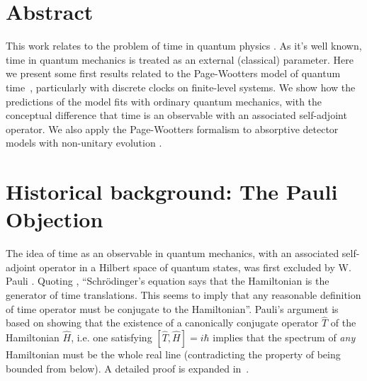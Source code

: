 \documentclass[a0,portrait]{a0poster}
\begin{document}
\begin{multicols}{2} %


\color{Navy} %

\section*{\large Abstract}
This work relates to the problem of time in quantum physics \cite{TQM1, TQM2}.
As it's well known, time in quantum mechanics is treated as an external (classical) parameter.
%
Here we present some first results related to
the Page-Wootters model of quantum time~\cite{Lloyd:Time, Maccone:Pauli},
particularly with discrete clocks on finite-level systems.
We show how the predictions of the model fits with
ordinary quantum mechanics, with the conceptual difference that
time is an observable with an associated self-adjoint operator.
We also apply the Page-Wootters formalism
to absorptive detector models with
non-unitary evolution \cite{RuschhauptAbsorption}.


\setlength{\parindent}{2em} %


\color{SaddleBrown} %


\section*{Historical background: The Pauli Objection}
The idea of time as an observable in quantum mechanics,
with an associated self-adjoint operator in a Hilbert space of quantum states,
was first excluded by W. Pauli \cite{PauliFootnote}.
%
Quoting \cite{Maccone:Pauli},
``Schr\"odinger's equation says that the Hamiltonian is the generator of time translations. This seems
to imply that any reasonable definition of time operator must be conjugate to the Hamiltonian''.
%
Pauli's argument
is based on showing that
the existence of
a canonically conjugate operator $\hat{T}$ of the Hamiltonian $\hat{H}$,
i.e. one satisfying
$
  \label{THcommutator}
  [\hat{T}, \hat{H}] = i\hbar
$
implies that the spectrum of \emph{any} Hamiltonian must be the whole real line
(contradicting the property of being bounded from below).
A detailed proof is expanded in~\cite{Galapon2002}.



\end{multicols}
\end{document}
